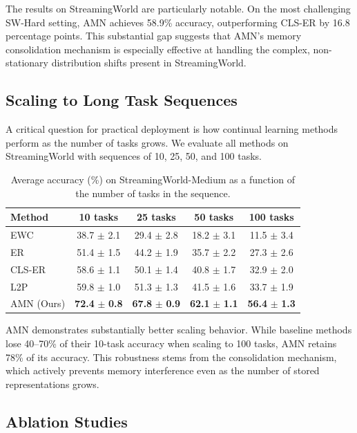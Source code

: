 \documentclass[11pt]{article}
\begin{document}
The results on StreamingWorld are particularly notable. On the most challenging SW-Hard setting, AMN achieves 58.9\% accuracy, outperforming CLS-ER by 16.8 percentage points. This substantial gap suggests that AMN's memory consolidation mechanism is especially effective at handling the complex, non-stationary distribution shifts present in StreamingWorld.

\subsection{Scaling to Long Task Sequences}

A critical question for practical deployment is how continual learning methods perform as the number of tasks grows. We evaluate all methods on StreamingWorld with sequences of 10, 25, 50, and 100 tasks.

\begin{table}[h]
\centering
\caption{Average accuracy (\%) on StreamingWorld-Medium as a function of the number of tasks in the sequence.}
\label{tab:scaling}
\begin{tabular}{@{}lcccc@{}}
\toprule
Method & 10 tasks & 25 tasks & 50 tasks & 100 tasks \\
\midrule
EWC & 38.7 $\pm$ 2.1 & 29.4 $\pm$ 2.8 & 18.2 $\pm$ 3.1 & 11.5 $\pm$ 3.4 \\
ER & 51.4 $\pm$ 1.5 & 44.2 $\pm$ 1.9 & 35.7 $\pm$ 2.2 & 27.3 $\pm$ 2.6 \\
CLS-ER & 58.6 $\pm$ 1.1 & 50.1 $\pm$ 1.4 & 40.8 $\pm$ 1.7 & 32.9 $\pm$ 2.0 \\
L2P & 59.8 $\pm$ 1.0 & 51.3 $\pm$ 1.3 & 41.5 $\pm$ 1.6 & 33.7 $\pm$ 1.9 \\
\midrule
AMN (Ours) & \textbf{72.4} $\pm$ \textbf{0.8} & \textbf{67.8} $\pm$ \textbf{0.9} & \textbf{62.1} $\pm$ \textbf{1.1} & \textbf{56.4} $\pm$ \textbf{1.3} \\
\bottomrule
\end{tabular}
\end{table}

AMN demonstrates substantially better scaling behavior. While baseline methods lose 40--70\% of their 10-task accuracy when scaling to 100 tasks, AMN retains 78\% of its accuracy. This robustness stems from the consolidation mechanism, which actively prevents memory interference even as the number of stored representations grows.

\subsection{Ablation Studies}
\end{document}
